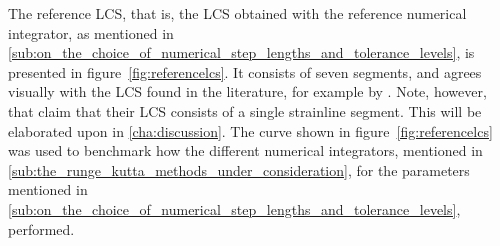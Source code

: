 

\clearpage
The reference LCS, that is, the LCS obtained with the reference numerical
integrator, as mentioned in
\cref{sub:on_the_choice_of_numerical_step_lengths_and_tolerance_levels}, is
presented in figure~\ref{fig:referencelcs}. It consists of seven segments,
and agrees visually with the LCS found in the literature, for example by
\textcite{farazmand2012computing}. Note, however, that
\citeauthor{farazmand2012computing} claim that their LCS consists of a single
strainline segment. This will be elaborated upon in
\cref{cha:discussion}. The curve shown in figure~\ref{fig:referencelcs} was used to
benchmark how the different numerical integrators, mentioned in
\cref{sub:the_runge_kutta_methods_under_consideration}, for the parameters
mentioned in
\cref{sub:on_the_choice_of_numerical_step_lengths_and_tolerance_levels},
performed.





